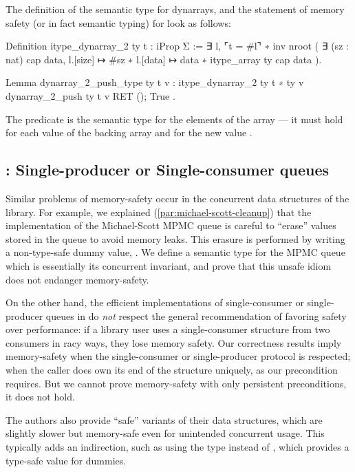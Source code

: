 The definition of the semantic type for dynarrays, and the statement of memory safety (or in fact semantic typing) for  look as follows:
\begin{coqcode}
Definition itype_dynarray_2 ty t : iProp Σ :=
  ∃ l,
  ⌜t = #l⌝ ∗
  inv nroot (
    ∃ (sz : nat) cap data,
    l.[size] ↦ #sz ∗
    l.[data] ↦ data ∗ itype_array ty cap data
  ).

Lemma dynarray_2_push_type ty t v :
  {{{ itype_dynarray_2 ty t ∗ ty v }}}
    dynarray_2_push ty t v
  {{{ RET (); True }}}.
\end{coqcode}

The predicate  is the semantic type for the elements of the array --- it must hold for each value of the backing array and for the new value .


\subsection{\Saturn: Single-producer or Single-consumer queues}

Similar problems of memory-safety occur in the concurrent data structures of the \Saturn library. For example, we explained (\cref{par:michael-scott-cleanup}) that the \Saturn implementation of the Michael-Scott MPMC queue is careful to ``erase'' values stored in the queue to avoid memory leaks. This erasure is performed by writing a non-type-safe dummy value, . We define a semantic type for the MPMC queue which is essentially its concurrent invariant, and prove that this unsafe idiom does not endanger memory-safety.

On the other hand, the efficient implementations of single-consumer or single-producer queues in \Saturn do \emph{not} respect the general \OCaml recommendation of favoring safety over performance: if a library user uses a single-consumer structure from two consumers in racy ways, they lose memory safety. Our correctness results imply memory-safety when the single-consumer or single-producer protocol is respected; when the caller does own its end of the structure uniquely, as our precondition requires. But we cannot prove memory-safety with only persistent preconditions, it does not hold.

The \Saturn authors also provide ``safe'' variants of their data structures, which are slightly slower but memory-safe even for unintended concurrent usage. This typically adds an indirection, such as using the type  instead of , which provides a type-safe  value for dummies.

